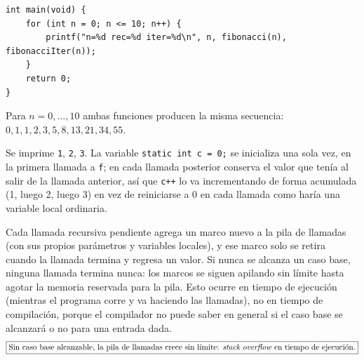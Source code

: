\documentclass[11pt,letterpaper]{article}
\theoremstyle{definition}
\begin{document}
\begin{description}
\begin{lstlisting}
int main(void) {
    for (int n = 0; n <= 10; n++) {
        printf("n=%d rec=%d iter=%d\n", n, fibonacci(n), fibonacciIter(n));
    }
    return 0;
}
\end{lstlisting}
Para $n = 0, \ldots, 10$ ambas funciones producen la misma secuencia:
$0, 1, 1, 2, 3, 5, 8, 13, 21, 34, 55$.

\item[\textbf{Ejercicio 5.}]
Se imprime \texttt{1}, \texttt{2}, \texttt{3}. La variable \texttt{static int c = 0;} se inicializa
una sola vez, en la primera llamada a \texttt{f}; en cada llamada posterior conserva el valor que
tenía al salir de la llamada anterior, así que \texttt{c++} lo va incrementando de forma acumulada
(1, luego 2, luego 3) en vez de reiniciarse a 0 en cada llamada como haría una variable local
ordinaria.

\item[\textbf{Ejercicio 6.}]
Cada llamada recursiva pendiente agrega un marco nuevo a la pila de llamadas (con sus propios
parámetros y variables locales), y ese marco solo se retira cuando la llamada termina y regresa un
valor. Si nunca se alcanza un caso base, ninguna llamada termina nunca: los marcos se siguen
apilando sin límite hasta agotar la memoria reservada para la pila. Esto ocurre en tiempo de
ejecución (mientras el programa corre y va haciendo las llamadas), no en tiempo de compilación,
porque el compilador no puede saber en general si el caso base se alcanzará o no para una entrada
dada.
\[\boxed{\text{Sin caso base alcanzable, la pila de llamadas crece sin límite: \emph{stack overflow} en tiempo de ejecución.}}\]

\end{description}
\end{document}
